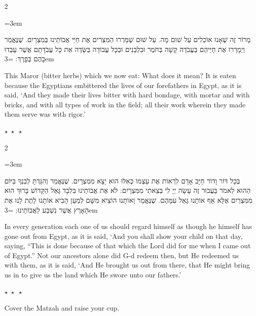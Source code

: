 \documentclass[11pt, openany]{book}
\newcommand{\instruction}[1]{%
  \par\vspace{3pt}
  \begin{tcolorbox}[
    enhanced,
    breakable,
    colback=sederlight,
    colframe=sedergold!40,
    boxrule=1pt,
    left=10pt,
    right=6pt,
    top=4pt,
    bottom=4pt,
    borderline west={3pt}{0pt}{sederwine!60},
    arc=6pt,
    outer arc=6pt,
  ]
    {\kidsinstructionfont\small\textcolor{sederwine}{#1}}
  \end{tcolorbox}
  \par\vspace{2pt}
}
\newcommand{\sederdivider}{%
  \par\vspace{6pt}
  \begin{center}
    \textcolor{sedergold}{\large$\star\;\star\;\star$}
  \end{center}
  \par\vspace{6pt}
}
\newenvironment{bilingual}{%
  \par\vspace{4pt}%
  \begin{paracol}{2}%
}{%
  \end{paracol}%
  \par\vspace{2pt}%
}
\newenvironment{hebrewcol}{%
  \switchcolumn[1]%
  \begingroup
  \RTL
  \hebrewfont\large
  \setstretch{1.4}%
  \emergencystretch=3em
  \tolerance=9999
  \parindent=0pt\relax
}{%
  \endRTL
  \endgroup
}
\newenvironment{englishcol}{%
  \switchcolumn[0]%
  \begingroup
  \setstretch{1.4}%
  \emergencystretch=3em
  \tolerance=9999
  \normalsize
  \rightskip=0.12in\relax
}{%
  \endgroup
}
\newcommand{\parasep}{%
  \par\vspace{3pt}
  \begin{center}
    \textcolor{sedergold!50}{\small$\star\;\star\;\star$}
  \end{center}
  \par\vspace{3pt}
}
\begin{document}
\begin{bilingual}
\begin{hebrewcol}
מָרוֹר זֶה שֶׁאָנוּ אוֹכְלִים עַל שׁוּם מָה. עַל שׁוּם שֶׁמֵּרְרוּ הַמִּצְרִים אֶת חַיֵּי אֲבוֹתֵינוּ בְּמִצְרָיִם. שֶׁנֶּאֱמַר וַיְמָרְרוּ אֶת חַיֵּיהֶם בַּעֲבֹדָה קָשָׁה בְּחֹמֶר וּבִלְבֵנִים וּבְכָל עֲבוֹדָה בַּשָּׂדֶה אֵת כָּל עֲבֹדָתָם אֲשֶׁר עָבְדוּ בָהֶם בְּפָרֶךְ:
\end{hebrewcol}
\begin{englishcol}
This Maror (bitter herbs) which we now eat: What does it mean? It is eaten because the Egyptians embittered the lives of our forefathers in Egypt, as it is said, `And they made their lives bitter with hard bondage, with mortar and with bricks, and with all types of work in the field; all their work wherein they made them serve was with rigor.'
\end{englishcol}
\end{bilingual}
\parasep

\begin{bilingual}
\begin{hebrewcol}
בְּכָל דּוֹר וָדוֹר חַיָּב אָדָם לִרְאוֹת אֶת עַצְמוֹ כְּאִלּוּ הוּא יָצָא מִמִּצְרָיִם. שֶׁנֶּאֱמַר וְהִגַּדְתָּ לְבִנְךָ בַּיּוֹם הַהוּא לֵאמֹר בַּעֲבוּר זֶה עָשָׂה יְיָ לִי בְּצֵאתִי מִמִּצְרָיִם: לֹא אֶת אֲבוֹתֵינוּ בִּלְבָד גָּאַל הַקָּדוֹשׁ בָּרוּךְ הוּא מִמִּצְרַיִם אֶלָּא אַף אוֹתָנוּ גָּאַל עִמָּהֶם. שֶׁנֶּאֱמַר וְאוֹתָנוּ הוֹצִיא מִשָּׁם לְמַעַן הָבִיא אוֹתָנוּ לָתֶת לָנוּ אֶת הָאָרֶץ אֲשֶׁר נִשְׁבַּע לַאֲבוֹתֵינוּ:
\end{hebrewcol}
\begin{englishcol}
In every generation each one of us should regard himself as though he himself has gone out from Egypt, as it is said, `And you shall show your child on that day, saying, ``This is done because of that which the Lord did for me when I came out of Egypt.'' Not our ancestors alone did G-d redeem then, but He redeemed us with them, as it is said, `And He brought us out from there, that He might bring us in to give us the land which He swore unto our fathers.'
\end{englishcol}
\end{bilingual}
\sederdivider

\instruction{Cover the Matzah and raise your cup.}
\end{document}
